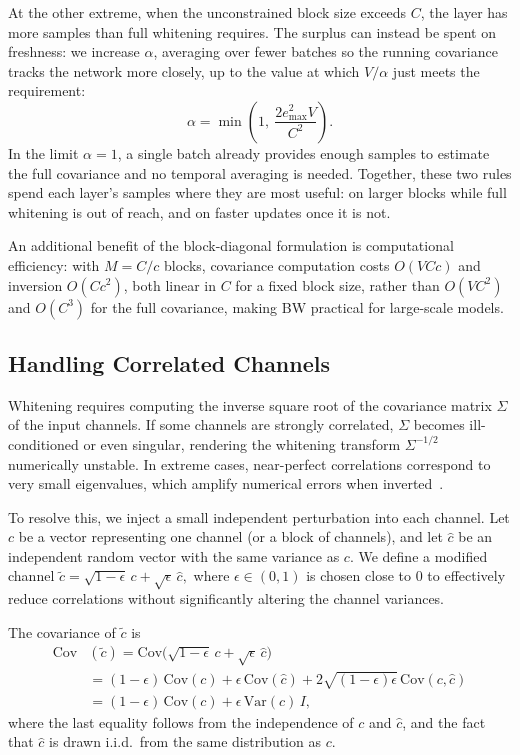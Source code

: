 At the other extreme, when the unconstrained block size exceeds $C$, the layer has more samples than full whitening requires.
The surplus can instead be spent on freshness: we increase $\alpha$, averaging over fewer batches so the running covariance tracks the network more closely, up to the value at which $V/\alpha$ just meets the requirement:
\begin{equation*}
\alpha = \min\!\left(1,\ \frac{2 e_{\max}^2 V}{C^2}\right).
\end{equation*}
In the limit $\alpha = 1$, a single batch already provides enough samples to estimate the full covariance and no temporal averaging is needed.
Together, these two rules spend each layer's samples where they are most useful: on larger blocks while full whitening is out of reach, and on faster updates once it is not.

An additional benefit of the block-diagonal formulation is computational efficiency: with $M = C/c$ blocks, covariance computation costs $O(V C c)$ and inversion $O(C c^2)$, both linear in $C$ for a fixed block size, rather than $O(V C^2)$ and $O(C^3)$ for the full covariance, making BW practical for large-scale models.

%
%
%
%

\subsection{Handling Correlated Channels}

Whitening requires computing the inverse square root of the covariance matrix $\Sigma$ of the input channels. 
If some channels are strongly correlated, $\Sigma$ becomes ill-conditioned or even singular, rendering the whitening transform $\Sigma^{-1/2}$ numerically unstable. 
In extreme cases, near-perfect correlations correspond to very small eigenvalues, which amplify numerical errors when inverted~\cite{desjardins2015natural,huang2018decorrelated,ledoit2004well}.

To resolve this, we inject a small independent perturbation into each channel. 
Let $c$ be a vector representing one channel (or a block of channels), and let $\hat{c}$ be an independent random vector with the same variance as $c$. 
We define a modified channel
$
\tilde{c} = \sqrt{1-\epsilon}\, c + \sqrt{\epsilon}\, \hat{c},
$
where $\epsilon \in (0,1)$ is chosen close to $0$ to effectively reduce correlations without significantly altering the channel variances.

The covariance of $\tilde{c}$ is
\begin{align*}
\mathrm{Cov}&(\tilde{c}) 
= \mathrm{Cov}\big(\sqrt{1-\epsilon}\, c + \sqrt{\epsilon}\, \hat{c}\big) \\
&= (1-\epsilon)\, \mathrm{Cov}(c) + \epsilon\, \mathrm{Cov}(\hat{c}) 
   + 2 \sqrt{(1-\epsilon)\epsilon}\, \mathrm{Cov}(c, \hat{c}) \\
&= (1-\epsilon)\, \mathrm{Cov}(c) + \epsilon\, \mathrm{Var}(c)\, I,
\end{align*}
where the last equality follows from the independence of $c$ and $\hat{c}$, and the fact that $\hat{c}$ is drawn i.i.d.\ from the same distribution as $c$.


